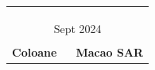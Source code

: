\begin{titlepage}
\begin{textblock}{0}
\begin{center}
\begin{tabular}{c}
{\\
\\
\\

{\Large Sept 2024} \\ [5pt]
\hline\\[10pt]
\bf \LARGE Coloane~~~Macao SAR
\FloatBarrier


\end{tabular}
\end{center}
\end{textblock}













\end{titlepage}